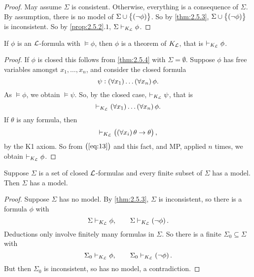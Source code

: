 \begin{proof}
May assume $ \Sigma $ is consistent. Otherwise, everything is a consequence of $ \Sigma $. By assumption, there is no model of $ \Sigma \cup \cbr{\notb{\phi}} $. So by \ref{thm:2.5.3}, $ \Sigma \cup \cbr{\notb{\phi}} $ is inconsistent. So by \ref{prop:2.5.2}.$ 1 $, $ \Sigma \vdash_{K_{\mathcal{L}}} \phi $.
\end{proof}

\begin{theorem}
If $ \phi $ is an $ \mathcal{L} $-formula with $ \vDash \phi $, then $ \phi $ is a theorem of $ K_{\mathcal{L}} $, that is $ \vdash_{K_{\mathcal{L}}} \phi $.
\end{theorem}

\begin{proof}
If $ \phi $ is closed this follows from \ref{thm:2.5.4} with $ \Sigma = \emptyset $. Suppose $ \phi $ has free variables amongst $ x_1, \dots, x_n $, and consider the closed formula
$$ \psi : \fab{x_1} \dots \fab{x_n}\phi. $$
As $ \vDash \phi $, we obtain $ \vDash \psi $. So, by the closed case, $ \vdash_{K_{\mathcal{L}}} \psi $, that is
\begin{equation}
\label{eq:13}
\vdash_{K_\LL} \fab{x_1} \dots \fab{x_n}\phi.
\end{equation}
If $ \theta $ is any formula, then
$$ \vdash_{K_\LL} \impb{\fab{x_i}\theta}{\theta}, $$
by the K1 axiom. So from $ \br{\ref{eq:13}} $ and this fact, and MP, applied $ n $ times, we obtain $ \vdash_{K_{\mathcal{L}}} \phi $.
\end{proof}

\begin{corollary}
\label{cor:2.5.6}
Suppose $ \Sigma $ is a set of closed $ \mathcal{L} $-formulas and every finite subset of $ \Sigma $ has a model. Then $ \Sigma $ has a model.
\end{corollary}

\begin{proof}
Suppose $ \Sigma $ has no model. By \ref{thm:2.5.3}, $ \Sigma $ is inconsistent, so there is a formula $ \phi $ with
$$ \Sigma \vdash_{K_\LL} \phi, \qquad \Sigma \vdash_{K_\LL} \notb{\phi}. $$ Deductions only involve finitely many formulas in $ \Sigma $. So there is a finite $ \Sigma_0 \subseteq \Sigma $ with
$$ \Sigma_0 \vdash_{K_\LL} \phi, \qquad \Sigma_0 \vdash_{K_\LL} \notb{\phi}. $$
But then $ \Sigma_0 $ is inconsistent, so has no model, a contradiction.
\end{proof}


